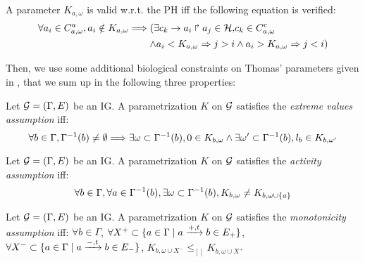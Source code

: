 
\begin{property}\label{pro:K-valid}
A parameter $K_{a,\omega}$ is valid w.r.t. the PH iff the following equation is verified:
\begin{align*}
\forall a_i\in C^a_{a,\omega},
		a_i \notin K_{a,\omega} \Longrightarrow (
  \exists c_k\rightarrow a_i\Rsh a_j\in\mathcal{H}, & c_k \in C^c_{a,\omega} \\
 \wedge a_i < K_{a,\omega} \Rightarrow j > i 
 & \wedge  a_i > K_{a,\omega} \Rightarrow j <i )
\end{align*}
\end{property}
		

Then, we use some additional biological constraints on Thomas' parameters given in
\cite{BernotSemBRN}, that we sum up in the following three properties:

\begin{property}
Let $\mathcal{G} = (\Gamma, E)$ be an IG. A parametrization $K$ on $\mathcal{G}$ satisfies the \emph{extreme values assumption} iff:
\label{prop:param_enum_extreme}
\[
  \forall b \in \Gamma, \Gamma^{-1}(b) \neq \emptyset \Longrightarrow \exists \omega \subset \Gamma^{-1}(b), 0 \in K_{b,\omega} \wedge \exists \omega' \subset \Gamma^{-1}(b), l_b \in K_{b,\omega'}
\]
\end{property}

\begin{property}
\label{prop:param_enum_activity}
Let $\mathcal{G} = (\Gamma, E)$ be an IG. A parametrization $K$ on $\mathcal{G}$ satisfies the \emph{activity assumption} iff:
\begin{align*}
  \forall b \in \Gamma, \forall a \in \Gamma^{-1}(b), \exists \omega \subset \Gamma^{-1}(b), K_{b,\omega} \neq K_{b,\omega \cup \{ a \}}
\end{align*}
\end{property}

\begin{property}
\label{prop:param_enum_monotonicity}
Let $\mathcal{G} = (\Gamma, E)$ be an IG. A parametrization $K$ on $\mathcal{G}$ satisfies the \emph{monotonicity assumption} iff:
$\forall b \in \Gamma$,
$\forall X^+ \subset \{ a \in \Gamma \mid a \xrightarrow{+, t} b \in E_+ \}$,
$\forall X^- \subset \{ a \in \Gamma \mid a \xrightarrow{-, t} b \in E_- \}$,
$K_{b,\omega \cup X^-} \leq_{[]} K_{b,\omega \cup X^+}$
\end{property}

